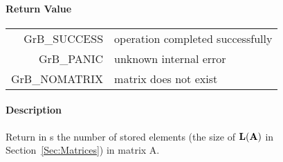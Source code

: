\paragraph{Return Value}

\begin{tabular}{rl}
{\sf GrB\_SUCCESS}	& operation completed successfully \\
{\sf GrB\_PANIC}	& unknown internal error \\
{\sf GrB\_NOMATRIX}	& matrix does not exist \\
\end{tabular}

\paragraph{Description}

Return in {\sf s} the number of stored elements (the size of $\bold{L}({\bf A})$
in Section~\ref{Sec:Matrices}) in matrix {\sf A}.

